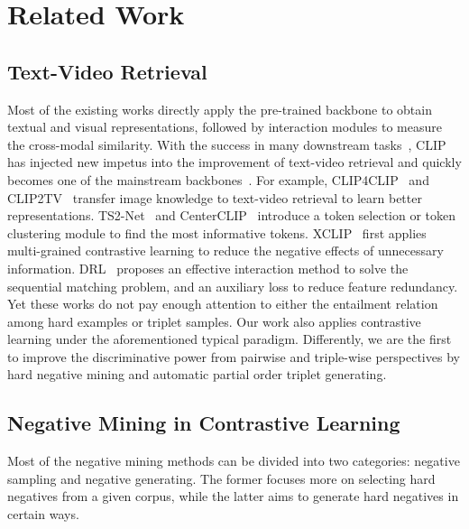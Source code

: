 \documentclass[sigconf]{acmart}
\begin{document}
\section{Related Work}
\subsection{Text-Video Retrieval}
Most of the existing works directly apply the pre-trained backbone to obtain textual and visual representations, followed by interaction modules to measure the cross-modal similarity. 
With the success in many downstream tasks~\cite{COOP,CLIPCAP,STYLECLIP,DALL_E2,ActionCLIP}, CLIP~\cite{clip2021} has injected new impetus into the improvement of text-video retrieval and quickly becomes one of the mainstream backbones~\cite{clip4clip2021,xpool2022,clip2tv2021,camoe2021,clip2video2021,drl2022,xclip2022}.
For example, CLIP4CLIP~\cite{clip4clip2021} and CLIP2TV~\cite{clip2tv2021} transfer image knowledge to text-video retrieval to learn better representations. 
TS2-Net~\cite{ts2net2022} and CenterCLIP~\cite{centerclip2022} introduce a token selection or token clustering module to find the most informative tokens. 
XCLIP~\cite{xclip2022} first applies multi-grained contrastive learning to reduce the negative effects of unnecessary information. DRL~\cite{drl2022} proposes an effective interaction method to solve the sequential matching problem, and an auxiliary loss to reduce feature redundancy.
Yet these works do not pay enough attention to either the entailment relation among hard examples or triplet samples.
Our work also applies contrastive learning under the aforementioned typical paradigm. 
Differently, we are the first to improve the discriminative power from pairwise and triple-wise perspectives by hard negative mining and automatic partial order triplet generating.






\subsection{Negative Mining in Contrastive Learning}


Most of the negative mining methods can be divided into two categories: negative sampling and negative generating. The former focuses more on selecting hard negatives from a given corpus, while the latter aims to generate hard negatives in certain ways.
\end{document}
